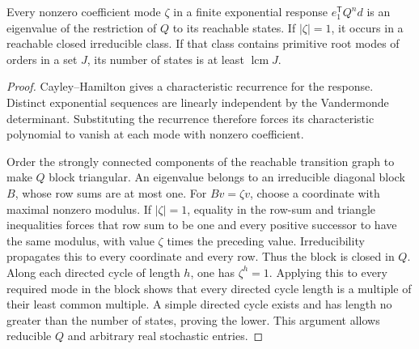 \begin{lemma}\label{lem:r72-cycles}
Every nonzero coefficient mode $\zeta$ in a finite exponential response $e_1^{\mathsf T}Q^nd$ is an eigenvalue of the restriction of $Q$ to its reachable states. If $|\zeta|=1$, it occurs in a reachable closed irreducible class. If that class contains primitive root modes of orders in a set $J$, its number of states is at least $\operatorname{lcm}J$.
\end{lemma}
\begin{proof}
Cayley--Hamilton gives a characteristic recurrence for the response. Distinct exponential sequences are linearly independent by the Vandermonde determinant. Substituting the recurrence therefore forces its characteristic polynomial to vanish at each mode with nonzero coefficient.

Order the strongly connected components of the reachable transition graph to make $Q$ block triangular. An eigenvalue belongs to an irreducible diagonal block $B$, whose row sums are at most one. For $Bv=\zeta v$, choose a coordinate with maximal nonzero modulus. If $|\zeta|=1$, equality in the row-sum and triangle inequalities forces that row sum to be one and every positive successor to have the same modulus, with value $\zeta$ times the preceding value. Irreducibility propagates this to every coordinate and every row. Thus the block is closed in $Q$. Along each directed cycle of length $h$, one has $\zeta^h=1$. Applying this to every required mode in the block shows that every directed cycle length is a multiple of their least common multiple. A simple directed cycle exists and has length no greater than the number of states, proving the lower. This argument allows reducible $Q$ and arbitrary real stochastic entries.
\end{proof}

